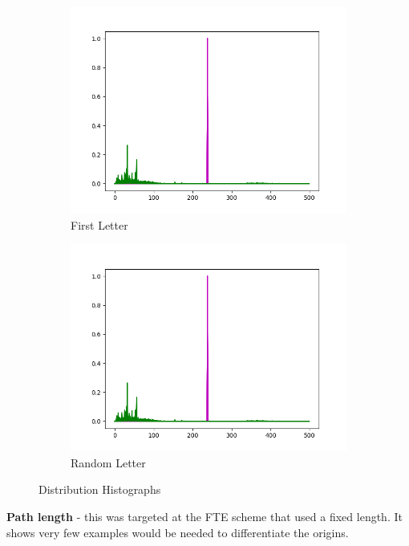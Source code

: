 \documentclass[ %
                    author={Samuel Russell},
                supervisor={Prof. Bogdan Warinschi},
                    degree={MEng},
                     title={Innocuous Ciphertexts},
                  subtitle={The DE-CENSOR Scheme},
                      type={research},
                      year={2018} ]{dissertation}
\begin{document}
\begin{figure}[h]
\begin{subfigure}[b]{0.24\textwidth}
		\includegraphics[width=\textwidth]{bob}
		\caption{First Letter}
		\label{fig:first_hist}
	\end{subfigure}
	\begin{subfigure}[b]{0.24\textwidth}
		\includegraphics[width=\textwidth]{bob}
		\caption{Random Letter}
		\label{fig:rand_hist}
	\end{subfigure}

	\caption{Distribution Histographs}\label{fig:hists}
\end{figure}

\textbf{Path length} - this was targeted at the FTE scheme that used a fixed length. It shows very few examples would be needed to differentiate the origins.
\end{document}
